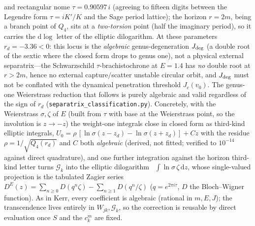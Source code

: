 \documentclass[12pt]{iopart}
\newcommand{\dd}{\mathrm{d}}
\begin{document}
and rectangular nome $\tau=0.90597\,i$ (agreeing to fifteen digits between the
Legendre form $\tau=iK'/K$ and the Sage period lattice); the horizon $r=2m$, being a
branch point of $Q_4$, sits at a \emph{two-torsion} point (half the imaginary
period), so it carries the $\dd\log$ letter of the elliptic dilogarithm. At these
parameters $r_d=-3.36<0$: this locus is the \emph{algebraic} genus-degeneration
$J_{\rm deg}$ (a double root of the sextic where the closed form drops to genus one),
not a physical external separatrix---the Schwarzschild $\tau$-brachistochrone at
$E=1.4$ has \emph{no} double root at $r>2m$, hence no external capture$/$scatter
unstable circular orbit, and $J_{\rm deg}$ must not be conflated with the dynamical
penetration threshold $J_c(v_0)$. The genus-one Weierstrass reduction that follows is
purely algebraic and valid regardless of the sign of $r_d$
(\texttt{separatrix\_classification.py}). Concretely,
with the Weierstrass $\sigma,\zeta$ of $E$ (built from $\tau$ with base at the
Weierstrass point, so the involution is $z\to-z$) the weight-one integrals close in
closed form as third-kind elliptic integrals,
$U_0=\rho\,[\ln\sigma(z-z_d)-\ln\sigma(z+z_d)]+Cz$ with the residue
$\rho=1/\sqrt{Q_4(r_d)}$ and $C$ both \emph{algebraic} (derived, not fitted; verified
to $10^{-14}$ against direct quadrature), and one further integration against the
horizon third-kind letter turns $\mathcal{G}_k$ into the elliptic
dilogarithm~\cite{Bloch2000,BeilinsonLevin1994}
$\int\ln\sigma\,\zeta\,\dd z$, whose single-valued projection is the tabulated
Zagier series~\cite{Zagier1990}
$D^E(z)=\sum_{n\ge0}D(q^n\zeta)-\sum_{n\ge1}D(q^n/\zeta)$
($q=e^{2\pi i\tau}$, $D$ the Bloch--Wigner function). As in Kerr, every coefficient is
algebraic (rational in $m,E,J$); the transcendence lives entirely in
$W_{jk},\mathcal{G}_k$, so the correction is reusable by direct evaluation once $S$
and the $c_k^m$ are fixed.
\end{document}
